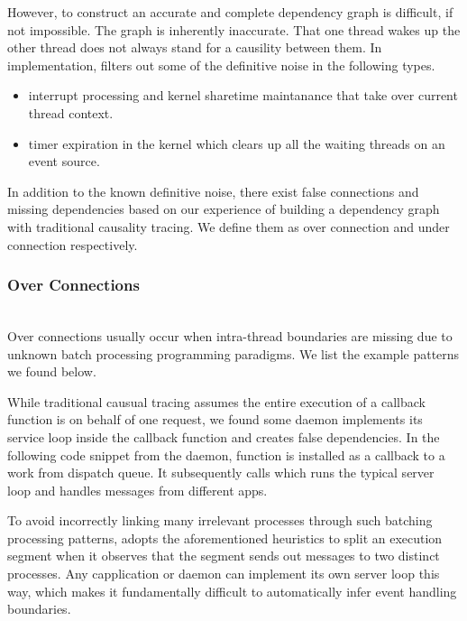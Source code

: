 However, to construct an accurate and complete dependency graph is difficult,
if not impossible. The graph is inherently inaccurate. That one thread wakes
up the other thread does not always stand for a causility between them. In
implementation, \xxx filters out some of the definitive noise in the following
types.

\begin{itemize}

\item interrupt processing and kernel sharetime maintanance that take over
current thread context.

\item timer expiration in the kernel which clears up all the waiting threads on
an event source.

\end{itemize}

In addition to the known definitive noise, there exist false connections and
missing dependencies based on our experience of building a dependency graph
with traditional causality tracing. We define them as over connection and under
connection respectively.

\subsubsection{Over Connections}\hfill\\
Over connections usually occur when intra-thread boundaries are missing due to
unknown batch processing programming paradigms. We list the example patterns we
found below.


While traditional causual tracing assumes the entire execution of a
callback function is on behalf of one request, we found some daemon
implements its service loop inside the callback function and creates false
dependencies. In the following code snippet from the  daemon, function
 is installed as a callback to a work from dispatch queue.
It subsequently calls  which runs the typical server
loop and handles messages from different apps.

To avoid incorrectly linking many irrelevant processes through such batching
processing patterns, \xxx adopts the aforementioned heuristics to split an
execution segment when it observes that the segment sends out messages to two
distinct processes. Any capplication or daemon can implement its own server loop
this way, which makes it fundamentally difficult to automatically infer event
handling boundaries.


